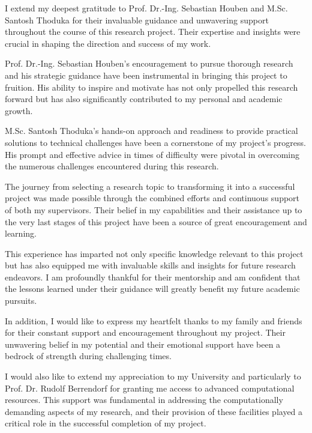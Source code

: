\documentclass[report.tex]{subfiles}
\begin{document}
    \begin{acknowledgements}
        I extend my deepest gratitude to Prof. Dr.-Ing. Sebastian Houben and M.Sc. Santosh Thoduka for their invaluable guidance and unwavering support throughout the course of this research project. Their expertise and insights were crucial in shaping the direction and success of my work.

        Prof. Dr.-Ing. Sebastian Houben's encouragement to pursue thorough research and his strategic guidance have been instrumental in bringing this project to fruition. His ability to inspire and motivate has not only propelled this research forward but has also significantly contributed to my personal and academic growth.

        M.Sc. Santosh Thoduka's hands-on approach and readiness to provide practical solutions to technical challenges have been a cornerstone of my project's progress. His prompt and effective advice in times of difficulty were pivotal in overcoming the numerous challenges encountered during this research.

        The journey from selecting a research topic to transforming it into a successful project was made possible through the combined efforts and continuous support of both my supervisors. Their belief in my capabilities and their assistance up to the very last stages of this project have been a source of great encouragement and learning.

        This experience has imparted not only specific knowledge relevant to this project but has also equipped me with invaluable skills and insights for future research endeavors. I am profoundly thankful for their mentorship and am confident that the lessons learned under their guidance will greatly benefit my future academic pursuits.

        In addition, I would like to express my heartfelt thanks to my family and friends for their constant support and encouragement throughout my project. Their unwavering belief in my potential and their emotional support have been a bedrock of strength during challenging times.

        I would also like to extend my appreciation to my University and particularly to Prof. Dr. Rudolf Berrendorf for granting me access to advanced computational resources. This support was fundamental in addressing the computationally demanding aspects of my research, and their provision of these facilities played a critical role in the successful completion of my project.
    \end{acknowledgements}
\end{document}
